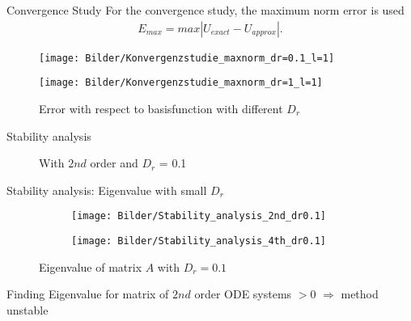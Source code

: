 \begin{frame}{Convergence Study}
	For the convergence study, the maximum norm error is used
	\begin{align*}
		E_{max} = max|U_{exact} - U_{approx}|.
	\end{align*}
	
	\begin{figure}
		\begin{minipage}{0.45\textwidth}
			\texttt{[image: Bilder/Konvergenzstudie\_maxnorm\_dr=0.1\_l=1]}
		\end{minipage}
		\hfill 
		\begin{minipage}{0.45\textwidth}
			\texttt{[image: Bilder/Konvergenzstudie\_maxnorm\_dr=1\_l=1]}
		\end{minipage}
		\caption{Error with respect to basisfunction with different $D_r$}
	\end{figure}
\end{frame}


\begin{frame}{Stability analysis}
	\begin{figure}
		\centering
		\qquad
		\caption{With $2nd$ order and $D_r$ = 0.1}
	\end{figure}
\end{frame}

\begin{frame}{Stability analysis: Eigenvalue with small $D_r$}
	\begin{figure}
		\begin{subfigure}{0.48\textwidth}
			\texttt{[image: Bilder/Stability\_analysis\_2nd\_dr0.1]}
		\end{subfigure}
		\hfill
		\begin{subfigure}{0.48\textwidth}
			\texttt{[image: Bilder/Stability\_analysis\_4th\_dr0.1]}
		\end{subfigure}
		\caption{Eigenvalue of matrix $A$ with $D_r = 0.1$}
	\end{figure}

	\begin{block}{Finding}
		Eigenvalue for matrix of $2nd$ order ODE systems $>0$ $\Rightarrow$ method unstable
	\end{block}
\end{frame}

